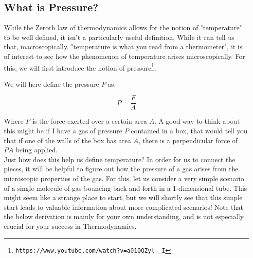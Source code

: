 \subsection{What is Pressure?}
While the Zeroth law of thermodynamics allows for the notion of "temperature" to be well defined, it isn't a particularly useful definition. While it can tell us that, macroscopically, "temperature is what you read from a thermometer", it is of interest to see how the phenomenon of temperature arises microscopically. For this, we will first introduce the notion of pressure\footnote{{\tt https://www.youtube.com/watch?v=a01QQZyl-\_I}}.

We will here define the pressure $P$ as:

\begin{equation}
    P = \frac{F}{A}
\end{equation}

Where $F$ is the force exerted over a certain area $A$. A good way to think about this might be if I have a gas of pressure $P$ contained in a box, that would tell you that if one of the walls of the box has area $A$, there is a perpendicular force of $PA$ being applied.\\

Just how does this help us define temperature? In order for us to connect the pieces, it will be helpful to figure out how the pressure of a gas arises from the microscopic properties of the gas. For this, let us consider a very simple scenario of a single molecule of gas bouncing back and forth in a 1-dimensional tube. This might seem like a strange place to start, but we will shortly see that this simple start leads to valuable information about more complicated scenarios! Note that the below derivation is mainly for your own understanding, and is not especially crucial for your success in Thermodynamics.

\begin{center}
\end{center}

